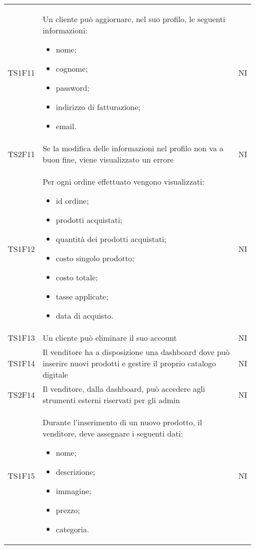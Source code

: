 {\begin{longtable}{C{3cm} C{10.2cm} C{1.5cm}}
TS1F11 & Un cliente può aggiornare, nel suo profilo, le seguenti informazioni:
\begin{itemize}
	\item nome;
	\item cognome;
	\item password;
	\item indirizzo di fatturazione;
	\item email.
\end{itemize}
& NI\\

TS2F11 & Se la modifica delle informazioni nel profilo non va a buon fine, viene visualizzato un errore & NI\\

TS1F12 & Per ogni ordine effettuato vengono visualizzati:
\begin{itemize}
	\item id ordine;
	\item prodotti acquistati;
	\item quantità dei prodotti acquistati;
	\item costo singolo prodotto;
	\item costo totale;
	\item tasse applicate;
	\item data di acquisto.
\end{itemize}
& NI\\

TS1F13 & Un cliente può eliminare il suo account & NI\\

TS1F14 & Il venditore ha a disposizione una dashboard dove può inserire nuovi prodotti e gestire il proprio catalogo digitale & NI\\

TS2F14 & Il venditore, dalla dashboard, può accedere agli strumenti esterni riservati per gli admin & NI\\

TS1F15 & Durante l'inserimento di un nuovo prodotto, il venditore, deve assegnare i seguenti dati:
\begin{itemize}
	\item nome;
	\item descrizione;
	\item immagine;
	\item prezzo;
	\item categoria.
\end{itemize} & NI\\


\end{longtable}}
